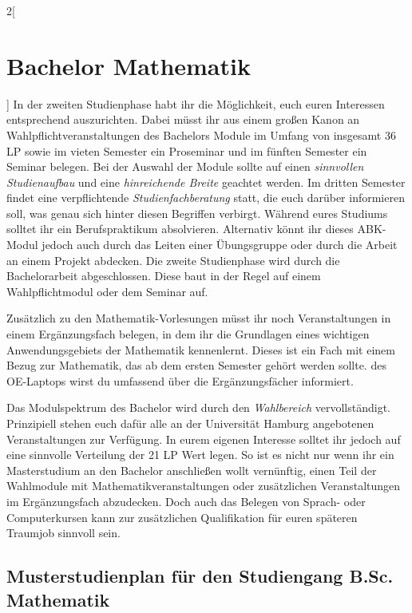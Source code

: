 \begin{multicols}{2}[\section{Bachelor Mathematik}]
In der zweiten Studienphase habt ihr die Möglichkeit, euch euren Interessen
entsprechend auszurichten. Dabei müsst ihr aus einem großen Kanon an
Wahlpflichtveranstaltungen des Bachelors Module im Umfang von insgesamt 36 LP
sowie im vieten Semester ein Proseminar und im fünften Semester ein Seminar
belegen. Bei der Auswahl der Module sollte auf einen \emph{sinnvollen
Studienaufbau} und eine \emph{hinreichende Breite} geachtet werden.  Im dritten
Semester findet eine verpflichtende \emph{Studienfachberatung} statt, die euch
darüber informieren soll, was genau sich hinter diesen Begriffen verbirgt.
Während eures Studiums solltet ihr ein Berufspraktikum absolvieren. Alternativ
könnt ihr dieses ABK-Modul jedoch auch durch das Leiten einer Übungsgruppe oder
durch die Arbeit an einem Projekt abdecken.  Die zweite Studienphase wird durch
die Bachelorarbeit abgeschlossen. Diese baut in der Regel auf einem
Wahlpflichtmodul oder dem Seminar auf.

Zusätzlich zu den Mathematik-Vorlesungen müsst ihr noch Veranstaltungen in
einem Ergänzungsfach belegen, in dem ihr die Grundlagen eines wichtigen
Anwendungsgebiets der Mathematik kennenlernt. Dieses ist ein Fach mit einem
Bezug zur Mathematik, das ab dem ersten Semester gehört werden sollte.  des OE-Laptops wirst du umfassend über die Ergänzungsfächer
informiert.

Das Modulspektrum des Bachelor wird durch den \emph{Wahlbereich}
vervollständigt. Prinzipiell stehen euch dafür alle an der Universität Hamburg
angebotenen Veranstaltungen zur Verfügung.  In eurem eigenen Interesse solltet
ihr jedoch auf eine sinnvolle Verteilung der 21 LP Wert legen. So ist es nicht
nur wenn ihr ein Masterstudium an den Bachelor anschließen wollt vernünftig,
einen Teil der Wahlmodule mit Mathematikveranstaltungen oder zusätzlichen
Veranstaltungen im Ergänzungsfach abzudecken.  Doch auch das Belegen von
Sprach- oder Computerkursen kann zur zusätzlichen Qualifikation für euren
späteren Traumjob sinnvoll sein.
\end{multicols}
\clearpage

\subsection{Musterstudienplan für den Studiengang B.Sc. Mathematik}

